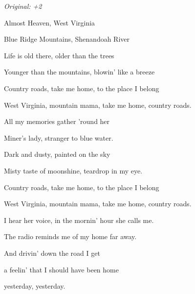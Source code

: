 \begin{song}


\begin{headerbox}
 \quad
\textit{Original: +2}
\end{headerbox}

\begin{hchordbox}
\end{hchordbox}

\Large

\bigskip

 Almost Heaven,  West Virginia \par
{} Blue Ridge Mountains, Shenandoah River \par
{} Life is old there, older than the trees \par
{}Younger than the mountains, blowin' like a breeze \par

\bigskip

Country roads, take me home, to the place I belong \par
West Virginia, mountain mama, take me home, country roads. \par

\bigskip

 All my memories  gather 'round her \par
{} Miner's lady, stranger to blue water. \par
{} Dark and dusty, painted on the sky \par
{}Misty taste of moonshine, teardrop in my eye. \par

\bigskip

Country roads, take me home, to the place I belong \par
West Virginia, mountain mama, take me home, country roads. \par

\bigskip

 I hear her voice, in the mornin' hour she calls me. \par
The radio reminds me of my home far away. \par
And drivin' down the road I get \par
a feelin' that I should have been home \par
{}yesterday, yesterday. \par


\end{song}
